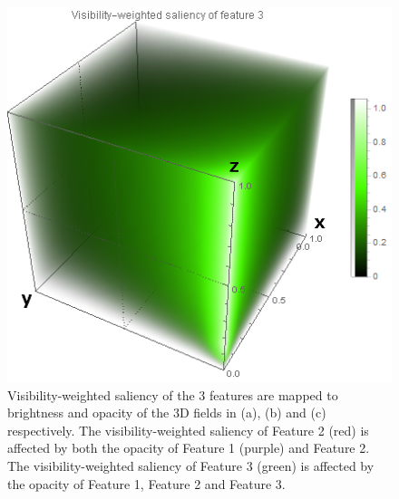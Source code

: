 \begin{figure}
\begin{minipage}{.3\textwidth}
		\subcaption{}
	\end{minipage}
	\begin{minipage}{.3\textwidth}
		\includegraphics[width=1\linewidth]{images/nucleon_strong_red_densityplot3}
		\subcaption{}
	\end{minipage}
	\caption{Visibility-weighted saliency of the 3 features are mapped to brightness and opacity of the 3D fields in (a), (b) and (c) respectively. The visibility-weighted saliency of Feature 2 (red) is affected by both the opacity of Feature 1 (purple) and Feature 2. The visibility-weighted saliency of Feature 3 (green) is affected by the opacity of Feature 1, Feature 2 and Feature 3.}
	\label{fig:nucleon_densityplot}
\end{figure}

